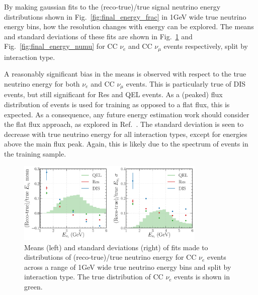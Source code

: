 By making gaussian fits to the (reco-true)/true signal neutrino energy distributions shown in
Fig.~\ref{fig:final_energy_frac} in \unit{1}{GeV} wide true neutrino energy bins, how the
resolution changes with energy can be explored. The means and standard deviations of these fits
are shown in Fig.~\ref{fig:final_energy_nuel} and Fig.~\ref{fig:final_energy_numu} for CC
$\nu_{e}$ and CC $\nu_{\mu}$ events respectively, split by interaction type.

A reasonably significant bias in the means is observed with respect to the true neutrino energy
for both $\nu_{e}$ and CC $\nu_{\mu}$ events. This is particularly true of DIS events, but still
significant for Res and QEL events. As a (peaked) flux distribution of events is used for training
as opposed to a flat flux, this is expected. As a consequence, any future energy estimation work
should consider the flat flux approach, as explored in Ref.~\cite{baldi2019}. The standard
deviation is seen to decrease with true neutrino energy for all interaction types, except for
energies above the main flux peak. Again, this is likely due to the spectrum of events in the
training sample.

\begin{figure} %
    \includegraphics[width=0.8\textwidth]{diagrams/6-cvn/chipsnet/final_energy_nuel.pdf}
    \caption[Means and standard deviations of fits to $\nu_{e}$ energy distributions.]
    {Means (left) and standard deviations (right) of fits made to distributions of
        (reco-true)/true neutrino energy for CC $\nu_{e}$ events across a range of \unit{1}{GeV}
        wide true neutrino energy bins and split by interaction type. The true distribution of CC
        $\nu_{e}$ events is shown in green.}
    \label{fig:final_energy_nuel}
\end{figure}


